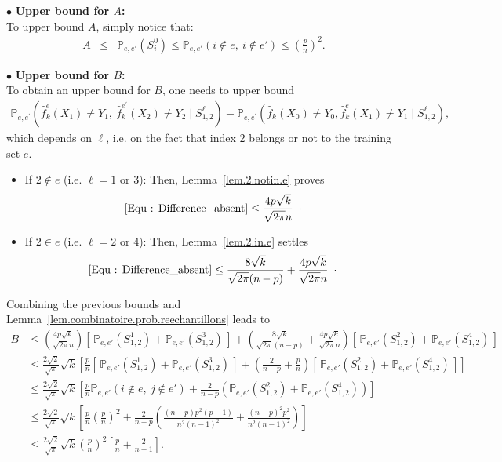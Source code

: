 \documentclass[twoside,11pt]{article}
\numberwithin{equation}{section}
\newcommand{\probi}[2]{\mathbb{P}_{#1}\left( #2 \right)}
\newcommand{\f}[1]{ \widehat{f}_k( #1 ) }
\newcommand{\fe}[1]{ \widehat{f}_k^e(#1 ) }
\newcommand{\fep}[1]{ \widehat{f}_k^{e^\prime}(#1 ) }
\newcommand{\gp}[1]{\left(#1\right)}
\newcommand{\1}{\mathds{1}}%
\newcommand{\paren}[1]{\left( #1 \right)}
\newcommand{\croch}[1]{\left[\, #1 \,\right]}
\renewcommand{\P}{\mathbb{P}}
\numberwithin{equation}{section}
\theoremstyle{plain}
\begin{document}

\noindent$\bullet$ \textbf{Upper bound for $A$:}\\
To upper bound $A$, simply notice that:
\begin{eqnarray*}
A &\leq&\probi{e,e'}{S^{0}_{i}} \leq \probi{e,e'}{i \notin e,\ i \notin e'} \leq\left(\frac{p}{n}\right)^2 .
\end{eqnarray*}

\noindent$\bullet$ \textbf{Upper bound for $B$:}\\
To obtain an upper bound for $B$, one needs to upper bound
\begin{eqnarray}\label{Equ : Difference_absent}
\P_{e,e^\prime} \paren{\fe{X_1}\neq Y_1,\ \fep{X_2}\neq Y_2 \mid S^{\ell}_{1,2}} - \P_{e,e^\prime} \paren{\f{X_0}\neq Y_0,\fe{X_{1}}\neq Y_{1} \mid S^{\ell}_{1,2}} ,
\end{eqnarray}
which depends on $\ell$, i.e. on the fact that index 2 belongs or not to the training set $e$.
\begin{itemize}
    \item If $2 \not\in e$ (i.e. $\ell = 1$ or 3):
    Then, Lemma~\ref{lem.2.notin.e} proves
    \begin{align*}
    \eqref{Equ : Difference_absent} \leq \frac{4p\sqrt{k}}{\sqrt{2\pi}n} \enspace\cdot
    \end{align*}

    \item If $2 \in e$ (i.e. $\ell = 2$ or 4):
    Then, Lemma~\ref{lem.2.in.e} settles
    \begin{eqnarray*}
    \eqref{Equ : Difference_absent} \leq \frac{8\sqrt{k}}{\sqrt{2\pi} (n-p)} + \frac{4p\sqrt{k}}{\sqrt{2\pi} n} \enspace\cdot
    \end{eqnarray*}
\end{itemize}
Combining the previous bounds and Lemma~\ref{lem.combinatoire.prob.reechantillons} leads to
\begin{align*}
B &\leq \gp{\frac{4p\sqrt{k}}{\sqrt{2\pi} n}}
\croch{ \probi{e,e'}{S^{1}_{1,2}}+\probi{e,e'}{S^{3}_{1,2}} }  + \gp{\frac{8\sqrt{k}}{\sqrt{2\pi} (n-p)} + \frac{4p\sqrt{k}}{\sqrt{2\pi} n}} \croch{ \probi{e,e'}{S^{2}_{1,2}}+ \probi{e,e'}{S^{4}_{1,2}} }  \\
%
&\leq \frac{2\sqrt{2}}{\sqrt{\pi}}\sqrt{k}\left[ \frac{p}{n} \croch{ \probi{e,e'}{S^{1}_{1,2}}+\probi{e,e'}{S^{3}_{1,2}} }
 + \gp{\frac{2}{n-p} + \frac{p}{n}} \croch{ \probi{e,e'}{S^{2}_{1,2}}+ \probi{e,e'}{S^{4}_{1,2}} } \right] \\
%
&\leq  \frac{2\sqrt{2}}{\sqrt{\pi}}\sqrt{k}\left[\frac{p}{n}\probi{e,e'}{i\notin e,\ j\notin e'} + \frac{2}{n-p}\left(\probi{e,e'}{S^{2}_{1,2}}+ \probi{e,e'}{S^{4}_{1,2}}\right)\right] \\
%
&\leq \frac{2\sqrt{2}}{\sqrt{\pi}}\sqrt{k}\left[\frac{p}{n}\gp{\frac{p}{n}}^2 + \frac{2}{n-p}\left(
\frac{(n-p)p^2(p-1)}{n^2(n-1)^2} + \frac{(n-p)^2p^2}{n^2(n-1)^2}\right)\right] \\
%
&\leq \frac{2\sqrt{2}}{\sqrt{\pi}}\sqrt{k}\gp{\frac{p}{n}}^2\left[\frac{p}{n} + \frac{2}{n-1}\right] .
\end{align*}
\end{document}

